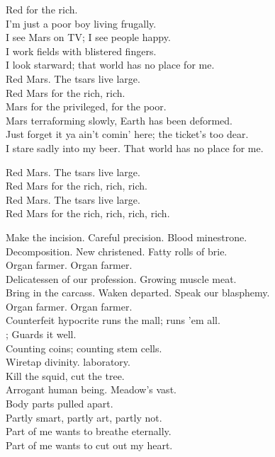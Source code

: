 
Red  for the rich. \\

I'm just a poor boy living frugally. \\
I see Mars on TV; I see people happy. \\
I work fields with blistered fingers. \\
I look starward; that world has no place for me. \\

Red Mars. The tsars live large. \\
Red Mars for the rich, rich. \\

Mars for the privileged,  for the poor. \\
Mars terraforming slowly, Earth has been deformed. \\
Just forget it ya ain't comin' here; the ticket's too dear. \\
I stare sadly into my beer. That world has no place for me.

Red Mars. The tsars live large. \\
Red Mars for the rich, rich, rich. \\
Red Mars. The tsars live large. \\
Red Mars for the rich, rich, rich, rich. \\




Make the incision. Careful precision. Blood minestrone. \\
Decomposition. New  christened. Fatty rolls of brie. \\

Organ farmer. Organ farmer. \\

Delicatessen of our profession. Growing muscle meat. \\
Bring in the carcass. Waken departed. Speak our blasphemy. \\

Organ farmer. Organ farmer. \\

Counterfeit hypocrite runs the mall; runs 'em all. \\
; Guards it well. \\
Counting coins; counting stem cells. \\
Wiretap divinity.  laboratory. \\
Kill the squid, cut the tree. \\
Arrogant human being. Meadow's vast. \\
Body parts pulled apart. \\
Partly smart, partly art, partly not. \\
Part of me wants to breathe eternally. \\
Part of me wants to cut out my heart. \\

